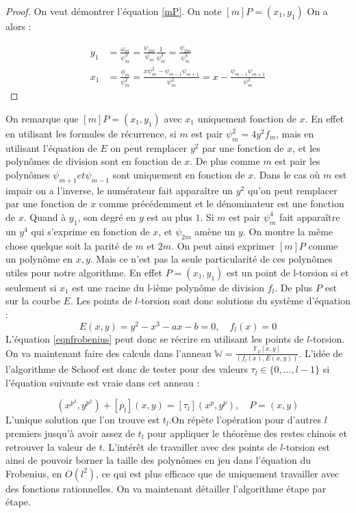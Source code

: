 \documentclass{article}
\begin{document}
\begin{proof}
On veut démontrer l'équation \ref{mP}. 
\newline
On note $[m]P = (x_1, y_1)$ 
On a alors : 

\begin{align*}
y_1 &= \frac{\omega_m}{\psi^3_m} = \frac{\psi_{2m}}{\psi_m} \frac{1}{\psi_m^3} = \frac{\psi_{2m}}{\psi_m^4} \\
x_1 &= \frac{\phi_m}{\psi^2_m} =  \frac{x \psi^2_m - \psi_{m-1}\psi_{m+1}}{\psi_m^2} = x - \frac{\psi_{m-1}\psi_{m+1}}{\psi_m^2}	
\end{align*}




\end{proof}
On remarque que $[m]P = (x_1, y_1)$ avec $x_1$ uniquement fonction de $x$. En effet en utilisant les formules de récurrence, si $m$ est pair $\psi_m^2 = 4y^2f_m$, mais en utilisant l'équation de $E$ on peut remplacer $y^2$ par une fonction de $x$, et les polynômes de division sont en fonction de $x$. De plus comme $m$ est pair les polynômes $\psi_{m+1} et \psi_{m-1}$ sont uniquement en fonction de $x$. Dans le cas où $m$ est impair on a l'inverse, le numérateur fait apparaître un $y^2$ qu'on peut remplacer par une fonction de $x$ comme précédemment et le dénominateur est une fonction de $x$. Quand à $y_1$, son degré en $y$ est au plus $1$. Si $m$ est pair $\psi_m^4$ fait apparaître un $y^4$ qui s'exprime en fonction de $x$, et $\psi_{2m}$ amène un $y$. On montre la même chose quelque soit la parité de $m$ et $2m$.
On peut ainsi exprimer $[m]P$ comme un polynôme en $x,y$. Mais ce n'est pas la seule particularité de ces polynômes utiles pour notre algorithme. En effet $P = (x_1, y_1)$ est un point de l-torsion si et seulement si $x_1$ est une racine du l-ième polynôme de division $f_l$. De plus $P$ est sur la courbe $E$. Les points de $l$-torsion sont donc solutions du système d'équation : 
\begin{equation}
E(x,y) = y^2 - x^3 - ax - b = 0, \quad f_l(x) = 0
\end{equation}
L'équation \ref{eqnfrobenius} peut donc se récrire en utilisant les points de $l$-torsion. On va maintenant faire des calculs dans l'anneau $\mathbb{W}= \frac{\mathbb{F_p}[x,y]}{(f_l(x), E(x,y))}$. L'idée de l'algorithme de Schoof est donc de tester pour des valeurs $\tau_l \in \lbrace 0, \ldots, l-1 \rbrace$ si l'équation suivante est vraie dans cet anneau :

\begin{equation}
(x^{p^2}, y^{p^2}) + [p_l](x,y) = [\tau_l](x^{p}, y^{p}),  \quad P=(x,y)
\end{equation}
L'unique solution que l'on trouve est $t_l$.On répète l'opération pour d'autres $l$ premiers jusqu'à avoir assez de $t_l$ pour appliquer le théorème des restes chinois et retrouver la valeur de $t$. L'intérêt de travailler avec des points de $l$-torsion est ainsi de pouvoir borner la taille des polynômes en jeu dans l'équation du Frobenius, en $O(l^2)$, ce qui est plus efficace que de uniquement travailler avec des fonctions rationnelles.
\newline
\medskip
On va maintenant détailler l'algorithme étape par étape. 
\end{document}
